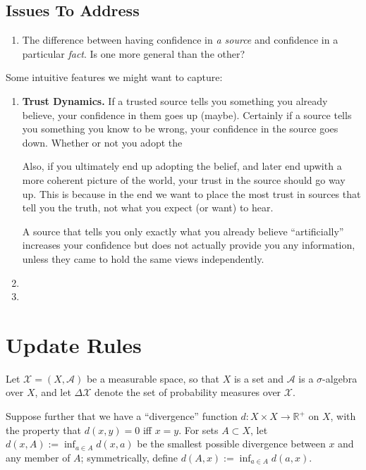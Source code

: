 \documentclass{article}
\begin{document}
\subsection*{Issues To Address}
\begin{enumerate}
    \item The difference between having confidence in \emph{a source} and confidence in a particular \emph{fact}.  Is one more general than the other?
\end{enumerate}

Some intuitive features we might want to capture:
\begin{enumerate}

    \item \textbf{Trust Dynamics.} If a trusted source tells you something you already believe, your confidence in them goes up (maybe). Certainly if a source tells you something you know to be wrong, your confidence in the source goes down.  Whether or not you adopt the

    Also, if you ultimately end up adopting the belief, and later end upwith a more coherent picture of the world, your trust in the source should go way up.
    This is because in the end we want to place the most trust in sources that tell you the truth, not what you expect (or want) to hear.

    A source that tells you only exactly what you already believe ``artificially'' increases your confidence but does not actually provide you any information, unless they came to hold the same views independently.

    \item
    \item
\end{enumerate}

\section{Update Rules}
\def\X{\mathcal X}
Let $\X = (X, \mathcal A)$ be a measurable space, so that $X$ is a set and $\mathcal A$ is a $\sigma$-algebra over $X$, and let $\Delta \X$ denote the set of probability measures over $\X$.

Suppose further that we have a ``divergence'' function $d : X \times X \to \mathbb R^+$ on $X$, with the property that $d(x,y) = 0$ iff $x = y$.
For sets $A \subset X$, let $d(x, A) := \inf_{a \in A} d(x,a)$ be the smallest possible divergence between $x$ and any member of $A$; symmetrically, define $d(A, x) := \inf_{a \in A} d(a,x)$.
\end{document}
